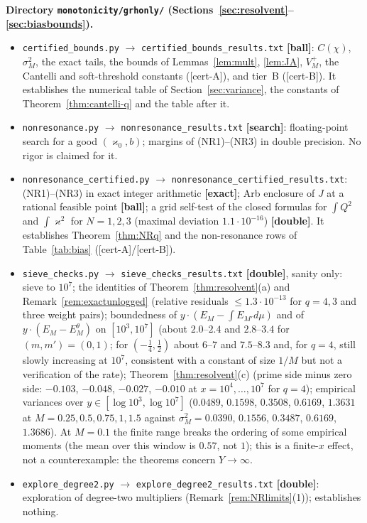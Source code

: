 \documentclass[11pt]{amsart}
\theoremstyle{definition}
\numberwithin{equation}{section}
\newcommand{\Ein}{E^{\theta}}
\newcommand{\certA}{\textsf{[cert-A]}}
\newcommand{\certB}{\textsf{[cert-B]}}
\begin{document}
\noindent\textbf{Directory \texttt{monotonicity/grhonly/}
(Sections~\ref{sec:resolvent}--\ref{sec:biasbounds}).}
\begin{itemize}
\item \texttt{certified\_bounds.py} $\to$
\texttt{certified\_bounds\_results.txt} \textbf{[ball]}: $C(\chi)$,
$\sigma_M^2$, the exact tails, the bounds of
Lemmas~\ref{lem:mult}, \ref{lem:JA}, $V_M^+$, the Cantelli and
soft-threshold constants (\certA), and tier~B (\certB). It
establishes the numerical table of Section~\ref{sec:variance}, the
constants of Theorem~\ref{thm:cantelli-q} and the table after it.
\item \texttt{nonresonance.py} $\to$
\texttt{nonresonance\_results.txt} \textbf{[search]}: floating-point
search for a good $(\varkappa_0,b)$; margins of (NR1)--(NR3) in
double precision. No rigor is claimed for it.
\item \texttt{nonresonance\_certified.py} $\to$
\texttt{nonresonance\_certified\_results.txt}: (NR1)--(NR3) in exact
integer arithmetic \textbf{[exact]}; Arb enclosure of $J$ at a
rational feasible point \textbf{[ball]}; a grid self-test of the
closed formulas for $\int Q^2$ and $\int\varkappa^2$ for $N=1,2,3$
(maximal deviation $1.1\cdot10^{-16}$) \textbf{[double]}. It
establishes Theorem~\ref{thm:NRq} and the non-resonance rows of
Table~\ref{tab:bias} (\certA/\certB).
\item \texttt{sieve\_checks.py} $\to$
\texttt{sieve\_checks\_results.txt} \textbf{[double]}, sanity only:
sieve to $10^7$; the identities of Theorem~\ref{thm:resolvent}(a)
and Remark~\ref{rem:exactunlogged} (relative residuals
$\le1.3\cdot10^{-13}$ for $q=4,3$ and three weight pairs);
boundedness of $y\cdot(E_M-\int E_{M'}d\mu)$ and of
$y\cdot(E_M-\Ein_M)$ on $[10^3,10^7]$ (about $2.0$--$2.4$ and
$2.8$--$3.4$ for $(m,m')=(0,1)$; for $(-\tfrac14,\tfrac12)$ about
$6$--$7$ and $7.5$--$8.3$ and, for $q=4$, still slowly increasing at
$10^7$, consistent with a constant of size $1/M$ but not a
verification of the rate); Theorem~\ref{thm:resolvent}(c) (prime
side minus zero side: $-0.103$, $-0.048$, $-0.027$, $-0.010$ at
$x=10^4,\dots,10^7$ for $q=4$); empirical variances over
$y\in[\log10^3,\log10^7]$ ($0.0489$, $0.1598$, $0.3508$, $0.6169$,
$1.3631$ at $M=0.25,0.5,0.75,1,1.5$ against
$\sigma_M^2=0.0390$, $0.1556$, $0.3487$, $0.6169$, $1.3686$). At
$M=0.1$ the finite range breaks the ordering of some empirical
moments (the mean over this window is $0.57$, not $1$); this is a
finite-$x$ effect, not a counterexample: the theorems concern
$Y\to\infty$.
\item \texttt{explore\_degree2.py} $\to$
\texttt{explore\_degree2\_results.txt} \textbf{[double]}:
exploration of degree-two multipliers
(Remark~\ref{rem:NRlimits}(1)); establishes nothing.
\end{itemize}
\end{document}
